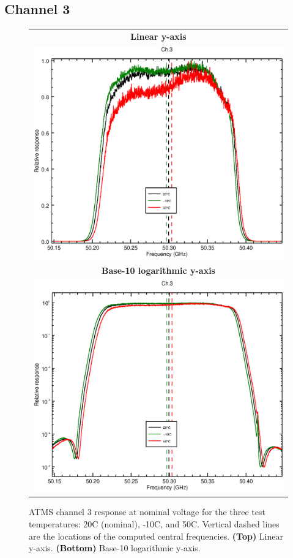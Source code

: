 \subsection{Channel 3}
\begin{figure}[H]
  \label{fig:Tset.ch3_response}
  \centering
  \begin{tabular}{c}
    \hspace{1.75cm}\sffamily\textbf{Linear y-axis} \\
    \includegraphics[scale=0.55]{graphics/srf/Tset/lin/atms_npp-3.eps} \\
    \hspace{1.75cm}\sffamily\textbf{Base-10 logarithmic y-axis} \\
    \includegraphics[scale=0.55]{graphics/srf/Tset/log/atms_npp-3.eps}
  \end{tabular}
  \caption{ATMS channel 3 response at nominal voltage for the three test temperatures: 20\textdegree{}C (nominal), -10\textdegree{}C, and 50\textdegree{}C. Vertical dashed lines are the locations of the computed central frequencies. \textbf{(Top)} Linear y-axis. \textbf{(Bottom)} Base-10 logarithmic y-axis.}
\end{figure}

